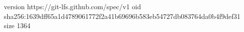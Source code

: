version https://git-lfs.github.com/spec/v1
oid sha256:1639dff65a1d4789061772f2a41b69696b583eb54727db083764da0b4f9def31
size 1364
